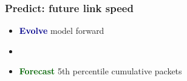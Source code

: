 \documentclass[svgnames]{beamer}
\begin{document}
\begin{frame}
\frametitle{\textbf{Predict}: future link speed}

\Large

\begin{itemize}
\item \textcolor{DarkBlue}{\bf Evolve} model forward

\item[]

\item \textcolor{DarkGreen}{\bf Forecast} 5th percentile cumulative packets


\end{itemize}

\end{frame}
\end{document}
